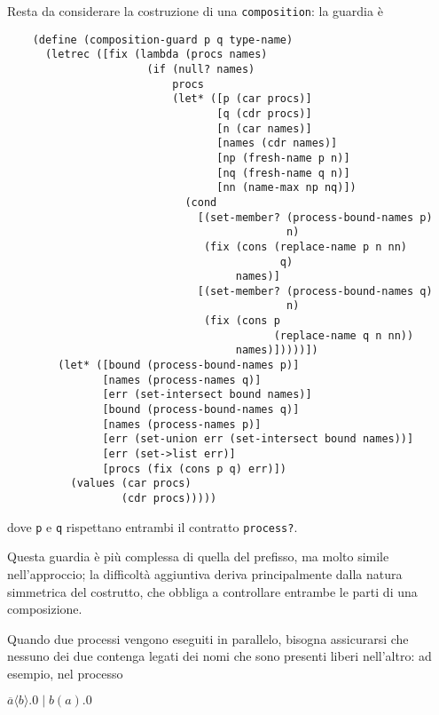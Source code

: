 Resta da considerare la costruzione di una \lstinline{composition}: la
guardia \`e

\begin{lstlisting}
    (define (composition-guard p q type-name)
      (letrec ([fix (lambda (procs names)
                      (if (null? names)
                          procs
                          (let* ([p (car procs)]
                                 [q (cdr procs)]
                                 [n (car names)]
                                 [names (cdr names)]
                                 [np (fresh-name p n)]
                                 [nq (fresh-name q n)]
                                 [nn (name-max np nq)])
                            (cond
                              [(set-member? (process-bound-names p)
                                            n)
                               (fix (cons (replace-name p n nn)
                                           q)
                                    names)]
                              [(set-member? (process-bound-names q)
                                            n)
                               (fix (cons p
                                          (replace-name q n nn))
                                    names)]))))])
        (let* ([bound (process-bound-names p)]
               [names (process-names q)]
               [err (set-intersect bound names)]
               [bound (process-bound-names q)]
               [names (process-names p)]
               [err (set-union err (set-intersect bound names))]
               [err (set->list err)]
               [procs (fix (cons p q) err)])
          (values (car procs)
                  (cdr procs)))))
\end{lstlisting}

dove \lstinline{p} e \lstinline{q} rispettano entrambi il contratto
\lstinline{process?}.

Questa guardia \`e pi\`u complessa di quella del prefisso, ma molto
simile nell'approccio; la difficolt\`a aggiuntiva deriva principalmente
dalla natura simmetrica del costrutto, che obbliga a controllare
entrambe le parti di una composizione.

Quando due processi vengono eseguiti in parallelo, bisogna assicurarsi
che nessuno dei due contenga legati dei nomi che sono presenti liberi
nell'altro: ad esempio, nel processo

\begin{pilisting}
$
    \overline{a}\langle b\rangle.0 \; | \;
    b(a).0
$
\end{pilisting}

